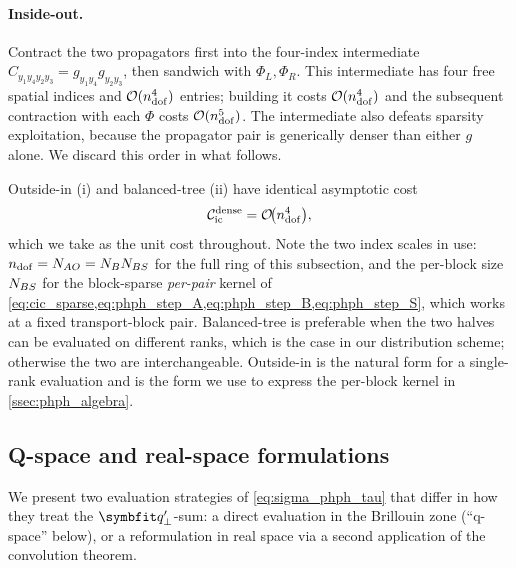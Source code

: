 \paragraph{Inside-out.} Contract the two propagators first into the
four-index intermediate $C_{y_1y_4y_2y_3}=g_{y_1y_4}g_{y_2y_3}$, then
sandwich with $\Phi_L,\Phi_R$. This intermediate has four free
spatial indices and $\mathcal{O}(n_{\mathrm{dof}}^{4})$ entries; building it costs
$\mathcal{O}(n_{\mathrm{dof}}^{4})$ and the subsequent contraction with each $\Phi$
costs $\mathcal{O}(n_{\mathrm{dof}}^{5})$. The intermediate also defeats sparsity
exploitation, because the propagator pair is generically denser
than either $g$ alone. We discard this order in what follows.

Outside-in (i) and
balanced-tree (ii) have identical asymptotic cost
\begin{equation}\label{eq:cic_cost}
  \mathcal{C}_\mathrm{ic}^\mathrm{dense}
  = \mathcal{O}\!\bigl(n_{\mathrm{dof}}^{4}\bigr),
\end{equation}
which we take as the unit cost throughout. Note the two index scales in
use: $n_{\mathrm{dof}}=N_{AO}=N_{B}N_{BS}$ for the full ring of this subsection, and
the per-block size $N_{BS}$ for the block-sparse \emph{per-pair} kernel
of \cref{eq:cic_sparse,eq:phph_step_A,eq:phph_step_B,eq:phph_step_S},
which works at a fixed transport-block pair. Balanced-tree is
preferable when the two halves can be evaluated on different ranks,
which is the case in our distribution scheme; otherwise the two are
interchangeable. Outside-in is the natural form for a single-rank
evaluation and is the form we use to express the per-block kernel
in \cref{ssec:phph_algebra}.

\subsection{Q-space and real-space formulations}
\label{ssec:phph_qspace}

We present two evaluation strategies of \cref{eq:sigma_phph_tau} that differ in how
they treat the $\qp'$-sum: a direct evaluation in the Brillouin zone
(``q-space'' below), or a reformulation in real space via a second
application of the convolution theorem.

